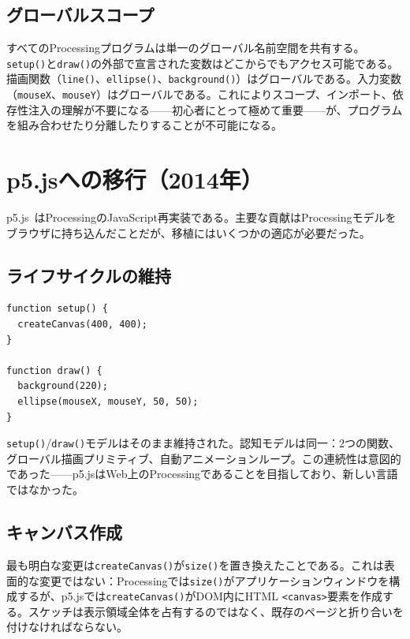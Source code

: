 \documentclass[10pt,letterpaper,twocolumn]{article}
\begin{document}
\subsection{グローバルスコープ}

すべてのProcessingプログラムは単一のグローバル名前空間を共有する。\texttt{setup()}と\texttt{draw()}の外部で宣言された変数はどこからでもアクセス可能である。描画関数（\texttt{line()}、\texttt{ellipse()}、\texttt{background()}）はグローバルである。入力変数（\texttt{mouseX}、\texttt{mouseY}）はグローバルである。これによりスコープ、インポート、依存性注入の理解が不要になる——初心者にとって極めて重要——が、プログラムを組み合わせたり分離したりすることが不可能になる。


\section{p5.jsへの移行（2014年）}
\label{sec:p5js}

p5.js~\citep{mccarthy2015p5js}はProcessingのJavaScript再実装である。主要な貢献はProcessingモデルをブラウザに持ち込んだことだが、移植にはいくつかの適応が必要だった。

\subsection{ライフサイクルの維持}

\begin{lstlisting}[style=p5style,caption={最小限のp5.jsスケッチ。}]
function setup() {
  createCanvas(400, 400);
}

function draw() {
  background(220);
  ellipse(mouseX, mouseY, 50, 50);
}
\end{lstlisting}

\texttt{setup()}/\texttt{draw()}モデルはそのまま維持された。認知モデルは同一：2つの関数、グローバル描画プリミティブ、自動アニメーションループ。この連続性は意図的であった——p5.jsはWeb上のProcessingであることを目指しており、新しい言語ではなかった。

\subsection{キャンバス作成}

最も明白な変更は\texttt{createCanvas()}が\texttt{size()}を置き換えたことである。これは表面的な変更ではない：Processingでは\texttt{size()}がアプリケーションウィンドウを構成するが、p5.jsでは\texttt{createCanvas()}がDOM内にHTML \texttt{<canvas>}要素を作成する。スケッチは表示領域全体を占有するのではなく、既存のページと折り合いを付けなければならない。
\end{document}
